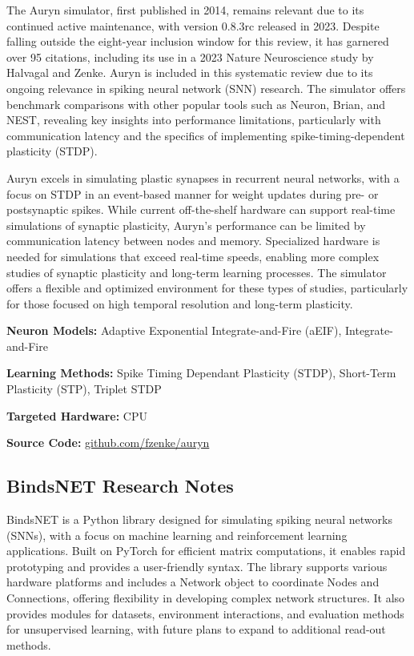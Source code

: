 The Auryn simulator, first published in 2014, remains relevant due to its continued active maintenance, with version 0.8.3rc released in 2023. Despite falling outside the eight-year inclusion window for this review, it has garnered over 95 citations, including its use in a 2023 Nature Neuroscience study by Halvagal and Zenke. Auryn is included in this systematic review due to its ongoing relevance in spiking neural network (SNN) research. The simulator offers benchmark comparisons with other popular tools such as Neuron, Brian, and NEST, revealing key insights into performance limitations, particularly with communication latency and the specifics of implementing spike-timing-dependent plasticity (STDP).

Auryn excels in simulating plastic synapses in recurrent neural networks, with a focus on STDP in an event-based manner for weight updates during pre- or postsynaptic spikes. While current off-the-shelf hardware can support real-time simulations of synaptic plasticity, Auryn's performance can be limited by communication latency between nodes and memory. Specialized hardware is needed for simulations that exceed real-time speeds, enabling more complex studies of synaptic plasticity and long-term learning processes. The simulator offers a flexible and optimized environment for these types of studies, particularly for those focused on high temporal resolution and long-term plasticity.

\begin{tcolorbox}[enhanced,attach boxed title to top center={yshift=-3mm,yshifttext=-1mm}, colback=blue!5!white,colframe=blue!75!black,colbacktitle=red!80!black, title=Auryn at a Glance,fonttitle=\bfseries, boxed title style={size=small,colframe=red!50!black} ]

\textbf{Neuron Models:} Adaptive Exponential  Integrate-and-Fire (aEIF), Integrate-and-Fire

\textbf{Learning Methods:} Spike Timing Dependant Plasticity (STDP), Short-Term Plasticity (STP), Triplet STDP  

\textbf{Targeted Hardware:} CPU 

\textbf{Source Code:} \href{https://github.com/fzenke/auryn}{github.com/fzenke/auryn}
\end{tcolorbox}
\subsection*{BindsNET Research Notes}\label{BindsNET}

BindsNET is a Python library designed for simulating spiking neural networks (SNNs), with a focus on machine learning and reinforcement learning applications. Built on PyTorch for efficient matrix computations, it enables rapid prototyping and provides a user-friendly syntax. The library supports various hardware platforms and includes a Network object to coordinate Nodes and Connections, offering flexibility in developing complex network structures. It also provides modules for datasets, environment interactions, and evaluation methods for unsupervised learning, with future plans to expand to additional read-out methods.

